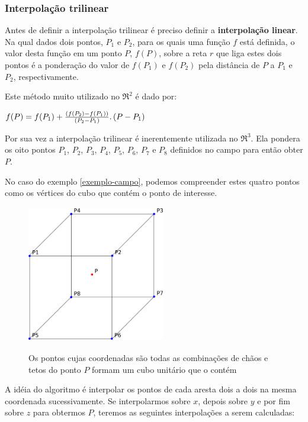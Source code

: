     \newpage
    \subsubsection{Interpolação trilinear}
    Antes de definir a interpolação trilinear é preciso definir a \textbf{interpolação linear}. Na qual dados dois pontos, $P_{1}$ e $P_{2}$, para os quais uma função $f$ está definida, o valor desta função em um ponto $P$, $f(P)$, sobre a reta $r$ que liga estes dois pontos é a ponderação do valor de $f(P_{1})$ e $f(P_{2})$ pela distância de $P$ a $P_{1}$ e $P_{2}$, respectivamente.
    
    Este método muito utilizado no $\Re ^{2}$ é dado por:
    
    $f(P) = f(P_{1}) + \frac{(f(P_{2}) - f(P_{1}))}{(P_{2} - P_{1})}\ldotp (P - P_{1})$
    
    Por sua vez a interpolação trilinear é inerentemente utilizada no $\Re ^{3}$. Ela pondera os oito pontos $P_{1}$, $P_{2}$, $P_{3}$, $P_{4}$, $P_{5}$, $P_{6}$, $P_{7}$ e $P_{8}$ definidos no campo para então obter $P$.
    
    No caso do exemplo \ref{exemplo-campo}, podemos compreender estes quatro pontos como os vértices do cubo que contém o ponto de interesse.
    
    \begin{figure}[!h]
      \begin{center}
         \includegraphics[width=60mm, height=60mm]{images/trilinearinterpolation.png}
         \label{fig:trilinearinterpolation}
         \caption{Os pontos cujas coordenadas são todas as combinações de chãos e tetos do ponto $P$ formam um cubo unitário que o contém}
      \end{center}
    \end{figure}
     
    A idéia do algoritmo é interpolar os pontos de cada aresta dois a dois na mesma coordenada sucessivamente. Se interpolarmos sobre $x$, depois sobre $y$ e por fim sobre $z$ para obtermos $P$, teremos as seguintes interpolações a serem calculadas:
    
